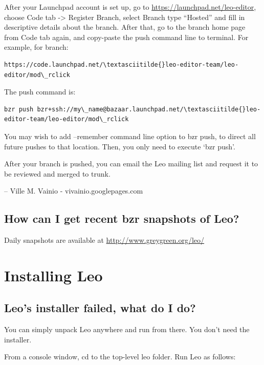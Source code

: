 \documentclass[a4paper,10pt,english]{sphinxmanual}
\begin{document}
After your Launchpad account is set up, go to
\href{https://launchpad.net/leo-editor}{https://launchpad.net/leo-editor}, choose Code tab -\textgreater{} Register Branch, select
Branch type ``Hosted'' and fill in descriptive details about the branch. After
that, go to the branch home page from Code tab again, and copy-paste the push
command line to terminal. For example, for branch:

\begin{Verbatim}[commandchars=\\\{\}]
https://code.launchpad.net/\textasciitilde{}leo-editor-team/leo-editor/mod\_rclick
\end{Verbatim}

The push command is:

\begin{Verbatim}[commandchars=\\\{\}]
bzr push bzr+ssh://my\_name@bazaar.launchpad.net/\textasciitilde{}leo-editor-team/leo-editor/mod\_rclick
\end{Verbatim}

You may wish to add --remember command line option to bzr push, to direct all
future pushes to that location. Then, you only need to execute `bzr push'.

After your branch is pushed, you can email the Leo mailing list and request it
to be reviewed and merged to trunk.

-- Ville M. Vainio - vivainio.googlepages.com


\subsection{How can I get recent bzr snapshots of Leo?}
\label{FAQ:how-can-i-get-recent-bzr-snapshots-of-leo}
Daily snapshots are available at \href{http://www.greygreen.org/leo/}{http://www.greygreen.org/leo/}


\section{Installing Leo}
\label{FAQ:installing-leo}

\subsection{Leo's installer failed, what do I do?}
\label{FAQ:leo-s-installer-failed-what-do-i-do}
You can simply unpack Leo anywhere and run from there.  You don't need the
installer.

From a console window, cd to the top-level leo folder.  Run Leo as follows:
\end{document}
